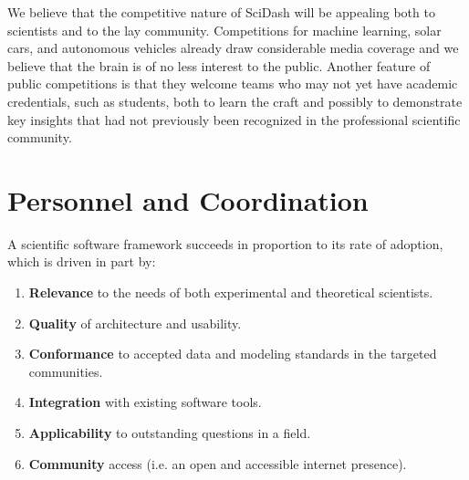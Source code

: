\documentclass[a4paper,12pt]{article}
\begin{document}
We believe that the competitive nature of SciDash will be appealing both to scientists and to the lay community.  Competitions for machine learning, solar cars, and autonomous vehicles already draw considerable media coverage and we believe that the brain is of no less interest to the public.  Another feature of public competitions is that they welcome teams who may not yet have academic credentials, such as students, both to learn the craft and possibly to demonstrate key insights that had not previously been recognized in the professional scientific community.  

\section{Personnel and Coordination}
\renewcommand{\theenumi}{\alph{enumi}}
A scientific software framework succeeds in proportion to its rate of adoption, which is driven in part by:
\begin{enumerate}
\item \textbf{Relevance} to the needs of both experimental and theoretical scientists.
\item \textbf{Quality} of architecture and usability.
\item \textbf{Conformance} to accepted data and modeling standards in the targeted communities.
\item \textbf{Integration} with existing software tools.  
\item \textbf{Applicability} to outstanding questions in a field.
\item \textbf{Community} access (i.e. an open and accessible internet presence).  
\end{enumerate}
\end{document}
